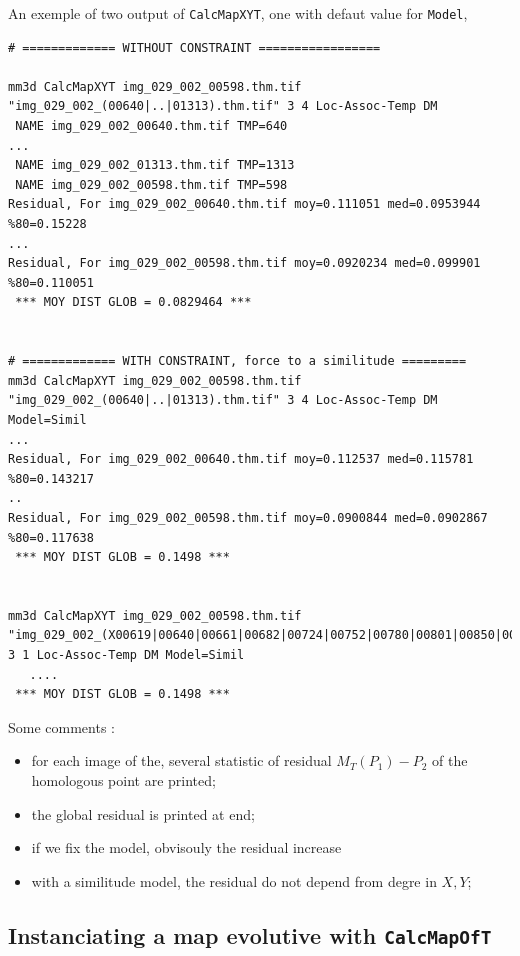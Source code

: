 An exemple of two output  of {\tt CalcMapXYT}, one with defaut value for {\tt Model},


\begin{verbatim}
# ============= WITHOUT CONSTRAINT =================

mm3d CalcMapXYT img_029_002_00598.thm.tif "img_029_002_(00640|..|01313).thm.tif" 3 4 Loc-Assoc-Temp DM
 NAME img_029_002_00640.thm.tif TMP=640
...
 NAME img_029_002_01313.thm.tif TMP=1313
 NAME img_029_002_00598.thm.tif TMP=598
Residual, For img_029_002_00640.thm.tif moy=0.111051 med=0.0953944 %80=0.15228
...
Residual, For img_029_002_00598.thm.tif moy=0.0920234 med=0.099901 %80=0.110051
 *** MOY DIST GLOB = 0.0829464 ***


# ============= WITH CONSTRAINT, force to a similitude =========
mm3d CalcMapXYT img_029_002_00598.thm.tif "img_029_002_(00640|..|01313).thm.tif" 3 4 Loc-Assoc-Temp DM Model=Simil
...
Residual, For img_029_002_00640.thm.tif moy=0.112537 med=0.115781 %80=0.143217
..
Residual, For img_029_002_00598.thm.tif moy=0.0900844 med=0.0902867 %80=0.117638
 *** MOY DIST GLOB = 0.1498 ***


mm3d CalcMapXYT img_029_002_00598.thm.tif "img_029_002_(X00619|00640|00661|00682|00724|00752|00780|00801|00850|00927|01049|01126|01170|01203|01247|01313).thm.tif" 3 1 Loc-Assoc-Temp DM Model=Simil
   ....
 *** MOY DIST GLOB = 0.1498 ***

\end{verbatim}


Some comments :

\begin{itemize}
   \item for each image of the, several statistic of residual $M_T(P_1)-P_2$ of the homologous point
         are printed;
   \item  the global residual is printed at end;
   \item  if we fix the model, obvisouly the residual increase
   \item with a similitude model, the residual do not depend from degre in $X,Y$;
\end{itemize}

                         

\subsection{Instanciating a map evolutive with {\tt CalcMapOfT}}

